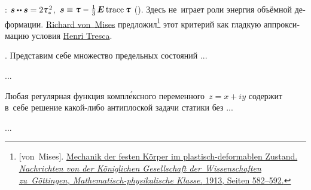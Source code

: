 \begin{otherlanguage}{russian}
:
${\stressdeviator \dotdotp \stressdeviator = 2 \mathtau_{*}^{\hspace{.25ex}2}}$, ${\, \stressdeviator \equiv \cauchystress - \frac{1}{3} \hspace{.25ex} \UnitDyad \trace{\hspace{-0.1ex}\cauchystress}}$ ().
Здесь не~играет роли энергия объёмной деформации.
\href{https://en.wikipedia.org/wiki/Richard_von_Mises}{Richard von~Mises} предложил\footnote{[von~Mises]. \href{https://gdz.sub.uni-goettingen.de/id/PPN252457811_1913?tify=\%7B"pages":\%5B602\%5D,"view":"info"\%7D}{Mechanik der festen K\"{o}rper im plastisch-deformablen Zustand. \emph{Nachrichten von der K\"{o}niglichen Gesellschaft der~Wis\-sen\-schaf\-ten zu~Göttingen, Mathematisch-physikalische Klasse.} 1913, Seiten 582\hbox{--}592.}}\hspace{-0.25ex}
этот критерий как гладкую аппроксимацию условия \href{https://en.wikipedia.org/wiki/Henri_Tresca}{Henri Tresca}.

.
Представим себе множество предельных состояний ...

...



\end{otherlanguage}



\label{section:cracks.antiplanedeformation}

\begin{otherlanguage}{russian}

Любая регулярная функция компл\'{е}ксного переменного~${z = x + iy}$ содержит в~себе решение какой\hbox{-}либо антиплоской задачи статики без ...

...



\end{otherlanguage}


